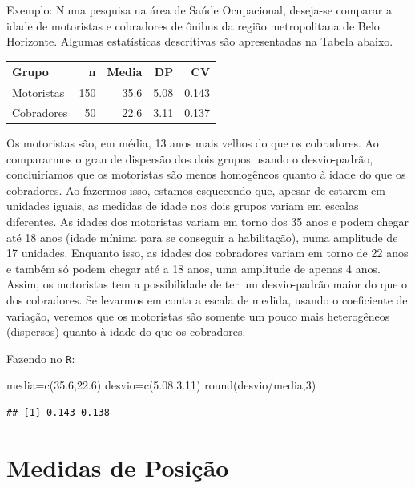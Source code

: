 \documentclass[
]{book}
\newenvironment{Shaded}{\begin{snugshade}}{\end{snugshade}}
\newcommand{\DecValTok}[1]{\textcolor[rgb]{0.00,0.00,0.81}{#1}}
\newcommand{\FloatTok}[1]{\textcolor[rgb]{0.00,0.00,0.81}{#1}}
\newcommand{\FunctionTok}[1]{\textcolor[rgb]{0.00,0.00,0.00}{#1}}
\newcommand{\NormalTok}[1]{#1}
\newcommand{\OtherTok}[1]{\textcolor[rgb]{0.56,0.35,0.01}{#1}}
\newcommand{\SpecialCharTok}[1]{\textcolor[rgb]{0.00,0.00,0.00}{#1}}
\begin{document}
Exemplo: Numa pesquisa na área de Saúde Ocupacional, deseja-se comparar a idade de motoristas e cobradores de ônibus da região metropolitana de Belo Horizonte. Algumas estatísticas descritivas são apresentadas na Tabela abaixo.

\begin{tabular}{l|r|r|r|r}
\hline
Grupo & n & Media & DP & CV\\
\hline
Motoristas & 150 & 35.6 & 5.08 & 0.143\\
\hline
Cobradores & 50 & 22.6 & 3.11 & 0.137\\
\hline
\end{tabular}

Os motoristas são, em média, 13 anos mais velhos do que os cobradores. Ao compararmos o grau de dispersão dos dois grupos usando o desvio-padrão, concluiríamos que os motoristas são menos homogêneos quanto à idade do que os cobradores. Ao fazermos isso, estamos esquecendo que, apesar de estarem em unidades iguais, as medidas de idade nos dois grupos variam em escalas diferentes. As idades dos motoristas variam em torno dos 35 anos e podem chegar até 18 anos (idade mínima para se conseguir a habilitação), numa amplitude de 17 unidades. Enquanto isso, as idades dos cobradores variam em torno de 22 anos e também só podem chegar até a 18 anos, uma amplitude de apenas 4 anos. Assim, os motoristas tem a possibilidade de ter um desvio-padrão maior do que o dos cobradores. Se levarmos em conta a escala de medida, usando o coeficiente de variação, veremos que os motoristas são somente um pouco mais heterogêneos (dispersos) quanto à idade do que os cobradores.

Fazendo no \(\texttt{R}\):

\begin{Shaded}
\begin{Highlighting}[]
\NormalTok{media}\OtherTok{=}\FunctionTok{c}\NormalTok{(}\FloatTok{35.6}\NormalTok{,}\FloatTok{22.6}\NormalTok{)}
\NormalTok{desvio}\OtherTok{=}\FunctionTok{c}\NormalTok{(}\FloatTok{5.08}\NormalTok{,}\FloatTok{3.11}\NormalTok{)}
\FunctionTok{round}\NormalTok{(desvio}\SpecialCharTok{/}\NormalTok{media,}\DecValTok{3}\NormalTok{)}
\end{Highlighting}
\end{Shaded}

\begin{verbatim}
## [1] 0.143 0.138
\end{verbatim}

\hypertarget{medidas-de-posiuxe7uxe3o}{%
\section{Medidas de Posição}\label{medidas-de-posiuxe7uxe3o}}
\end{document}
